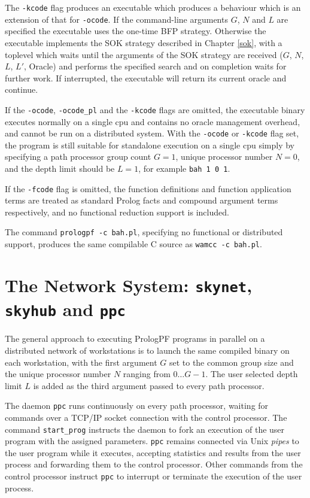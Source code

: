 The \texttt{-kcode} flag produces an executable which produces a behaviour which is
an extension of that for \texttt{-ocode}.  If the command-line arguments $G$, $N$ and
$L$ are specified the executable uses the one-time BFP strategy.  Otherwise the
executable implements the SOK strategy described in Chapter \ref{sok},
with a toplevel which waits until the
arguments of the SOK strategy are received ($G$, $N$, $L$, $L'$, Oracle) and
performs the specified search and on completion waits for further work.  If
interrupted, the executable will return its current oracle and continue.

If the \texttt{-ocode}, \texttt{-ocode\_{}pl} and the \texttt{-kcode} flags are omitted,
the executable binary executes normally on
a single cpu and contains no oracle management overhead, and cannot be run on
a distributed system.  With the \texttt{-ocode} or \texttt{-kcode} flag set, the program is still
suitable for standalone execution on a single cpu simply by specifying a path
processor group count $G=1$, unique processor number $N=0$, and the depth limit
should be $L=1$, for example
\texttt{bah 1 0 1}.

If the \texttt{-fcode} flag is omitted, the function definitions and function
application terms are treated as standard Prolog facts and compound argument
terms respectively, and no functional reduction support is included.

The command \texttt{prologpf -c bah.pl}, specifying no functional or distributed
support, produces the same compilable C source as \texttt{wamcc -c bah.pl}.

\section{The Network System: \texttt{skynet}, \texttt{skyhub} and \texttt{ppc}} %
\label{skynet}

The general approach to executing PrologPF programs in parallel on a distributed
network of workstations is to launch the same compiled binary on each workstation,
with the first argument $G$ set to the common group size and the unique
processor number $N$ ranging from $0\ldots G-1$.  The user selected depth limit $L$
is added as the third argument passed to every path processor.

The daemon \texttt{ppc} runs continuously on every path processor,
waiting for commands over a TCP/IP socket connection with the control
processor.  The command \texttt{start\_{}prog} instructs the daemon to
fork an execution of the user program with the assigned parameters.
\texttt{ppc} remains connected via Unix \textit{pipes} to the user
program while it executes,  accepting statistics and results from the
user process and forwarding them to the control processor.  Other commands from
the control processor instruct \texttt{ppc} to interrupt or terminate the
execution of the user process.

